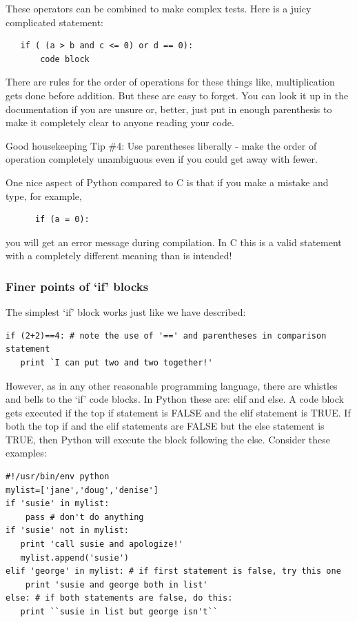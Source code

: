 \documentclass[11pt]{book}
\begin{document}
{{These operators can be combined to make complex tests.  Here is a juicy complicated statement:

{ \color{blue} \begin{verbatim}
   if ( (a > b and c <= 0) or d == 0):
       code block
   \end{verbatim}}
\noindent
There are rules for the order of operations for these things like, multiplication gets done before addition.   But these are easy to forget.  You can look it up in the documentation if
you are unsure or, better, just put in enough parenthesis to
make it completely clear to anyone reading your code.

\noindent
{\color{magenta}Good housekeeping Tip \#4: Use parentheses liberally - make the order of operation completely unambiguous even if you could get away with fewer. }


One nice aspect of Python compared to C is that if you make
a mistake and type, for example,

{\color{blue}   \begin{verbatim}
      if (a = 0):
         \end{verbatim}}

\noindent you will get an error message during compilation.  In C this
is a valid statement with a completely different meaning
than is intended!


\subsubsection{Finer points of `if' blocks}

The simplest `if' block works just like we have described:
{ \color{blue} \begin{verbatim}
if (2+2)==4: # note the use of '==' and parentheses in comparison statement
   print `I can put two and two together!'
\end{verbatim}}

However, as in  any other reasonable programming language, there are whistles and bells to the `if' code blocks.  In Python these are:  {\color{blue}elif} and {\color{blue}else}.
A code block gets executed if the top {\color{blue}if} statement is FALSE and the  {\color{blue}elif}  statement is TRUE.  If both the top {\color{blue}if} and the {\color{blue}elif}  statements are FALSE but the  {\color{blue}else}  statement is TRUE, then Python will execute the block following the  {\color{blue}else}.  Consider these examples:

{ \color{blue} \begin{verbatim}
#!/usr/bin/env python
mylist=['jane','doug','denise']
if 'susie' in mylist:
    pass # don't do anything
if 'susie' not in mylist:
   print 'call susie and apologize!'
   mylist.append('susie')
elif 'george' in mylist: # if first statement is false, try this one
    print 'susie and george both in list'
else: # if both statements are false, do this:
   print ``susie in list but george isn't``
\end{verbatim}}

}}
\end{document}
